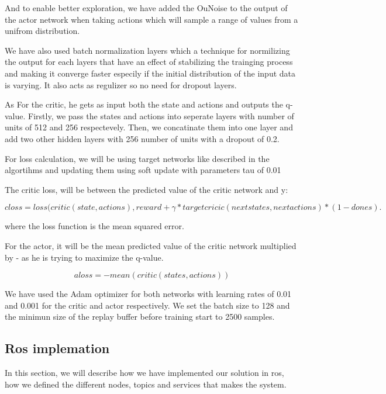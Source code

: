 \documentclass[12pt]{extarticle}
\begin{document}
And to enable better exploration, we have added the OuNoise to the output of the actor network when taking actions which will sample a range of values from a unifrom distribution.


We have also used batch normalization layers \cite{ioffe2015batch} which a  technique for normilizing the output for each layers that have an effect of stabilizing the trainging process and making it converge faster especily if the initial distribution of the input data is varying. It also acts as regulizer so no need for dropout layers.

As For the critic, he gets as input  both the state and actions and outputs the q-value. Firstly, we pass the states and actions into seperate layers 
with number of units of 512 and 256 respectevely. Then, we concatinate them into one layer and add two other hidden layers with 256 number of units with a dropout of 0.2.

For loss calculation, we will be using target networks like described in the algortihms and updating them using soft update with parameters tau of 0.01

The critic loss, will be between the predicted value of the critic network and y:

 

     \begin{equation} \label{critic_loss}
     closs= loss(critic(state,actions),reward+ \gamma*targetcricic(nextstates,nextactions)*(1-dones).
   \end{equation}
 
where the loss function is the mean squared error.

For the actor, it will be the mean predicted value of the critic network multiplied by - as  he is trying to maximize the q-value.

\begin{equation} \label{actor_loss}
     aloss= -mean(critic(states,actions))
   \end{equation}
   
We have used the Adam optimizer for both networks with learning rates of 0.01 and 0.001 for the critic and actor respectively. We set the batch size to 128 and the minimun size of the replay buffer before training start to 2500 samples.

\subsection{Ros implemation}
In this section, we will describe how we have implemented our solution in ros, how we defined the different nodes, topics and services that makes the system.
\end{document}
